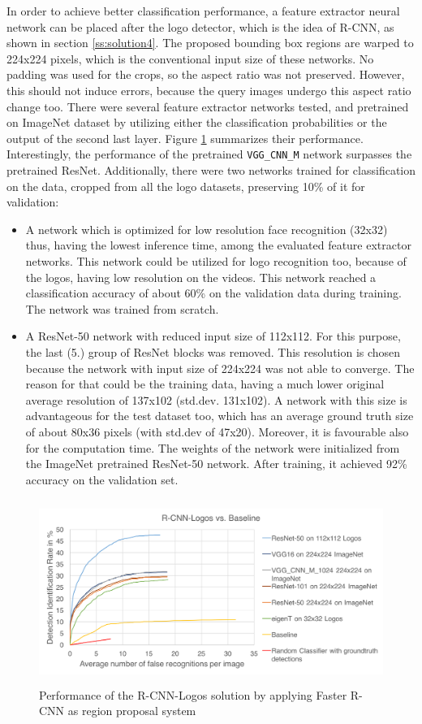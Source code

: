 In order to achieve better classification performance, a feature extractor neural network can be placed after the logo detector, which is the idea of R-CNN, as shown in section \ref{ss:solution4}. The proposed bounding box regions are warped to 224x224 pixels, which is the conventional input size of these networks. No padding was used for the crops, so the aspect ratio was not preserved. However, this should not induce errors, because the query images undergo this aspect ratio change too. There were several feature extractor networks tested, and pretrained on ImageNet dataset by utilizing either the classification probabilities or the output of the second last layer. Figure \ref{f:sol4} summarizes their performance. Interestingly, the performance of the pretrained \texttt{VGG\_CNN\_M} network surpasses the pretrained ResNet. Additionally, there were two networks trained for classification on the data, cropped from all the logo datasets, preserving 10\% of it for validation:
\begin{itemize}
    \item A network \cite{ies_2016_herrmann_video_face_recognition} which is optimized for low resolution face recognition (32x32) thus, having the lowest inference time, among the evaluated feature extractor networks. This network could be utilized for logo recognition too, because of the logos, having low resolution on the videos. This network reached a classification accuracy of about 60\% on the validation data during training. The network was trained from scratch.
    \item A ResNet-50 network with reduced input size of 112x112. For this purpose, the last (5.) group of ResNet blocks was removed. This resolution is chosen because the network with input size of 224x224 was not able to converge. The reason for that could be the training data, having a much lower original average resolution of 137x102 (std.dev. 131x102). A network with this size is advantageous for the test dataset too, which has an average ground truth size of about 80x36 pixels (with std.dev of 47x20). Moreover, it is favourable also for the computation time. The weights of the network were initialized from the ImageNet pretrained ResNet-50 network. After training, it achieved 92\% accuracy on the validation set.
\end{itemize}
\begin{figure}
  \centering
  \includegraphics[height=60mm]{images/mt/sol4.png}
  \caption{Performance of the R-CNN-Logos solution by applying Faster R-CNN as region proposal system}
  \label{f:sol4}
\end{figure}



